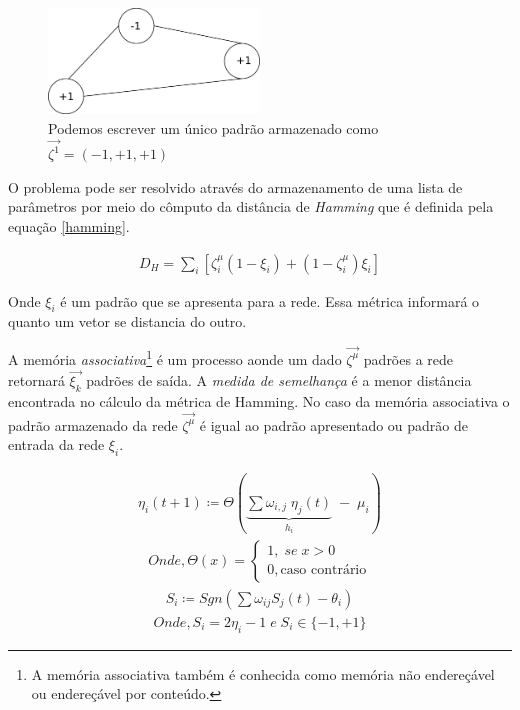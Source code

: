 \begin{figure}[H]
	\centering
	\includegraphics[width=0.5\textwidth]{Imagens/Fig19.png}
	\caption{Podemos escrever um único padrão armazenado como $\vec{\zeta^{1}}=(-1,+1,+1)$}
	\label{1padrao}
\end{figure}

O problema pode ser resolvido através do armazenamento de uma lista de parâmetros por meio do cômputo da distância de \textit{Hamming} que é definida pela equação \ref{hamming}.

\begin{eqnarray}
D_{H} = \sum_{i} [ \zeta^{\mu}_{i} (1-\xi_{i}) + (1 - \zeta^{\mu}_{i}) \xi_{i}]
\label{hamming}
\end{eqnarray}

Onde $\xi_{i}$ é um padrão que se apresenta para a rede. Essa métrica informará o quanto um vetor se distancia do outro.

A memória \textit{associativa}\footnote{A memória associativa também é conhecida como memória não endereçável ou endereçável por conteúdo.} é um processo aonde um dado $\vec{\zeta^{\mu}}$ padrões a rede retornará $\vec{\xi_{k}}$ padrões de saída. A \textit{medida de semelhança} é a menor distância encontrada no cálculo da métrica de Hamming. No caso da memória associativa o padrão armazenado da rede $\vec{\zeta^{\mu}}$ é igual ao padrão apresentado ou padrão de entrada da rede $\xi_{i}$.

\begin{tcolorbox}[colback=green!5,colframe=green!40!black,title=Faça a transformação de variáveis de \ref{ni} para \ref{si}.]
	\begin{eqnarray}
		\eta_{i}(t+1) \coloneqq \Theta\left( \underbrace{\sum \omega_{i,j}\; \eta_{j}(t)}_{h_{i}}\;-\;\mu_{i}\right) 
		\label{ni}
	\end{eqnarray}
	\begin{eqnarray}
	Onde, 
		\Theta(x)=
		\begin{cases}
		1,\; se\; x>0 \\ 
		0, \text{caso contrário}
		\end{cases} \nonumber
	\end{eqnarray}
	\begin{eqnarray}
		S_{i} \coloneqq Sgn (\sum \omega_{ij} S_{j}(t) - \theta_{i} )
		\label{si}
	\end{eqnarray}
	\begin{eqnarray}
	    Onde,
		S_{i}= 2\eta_{i}-1\; e\;  S_{i} \in\{-1,+1\} \nonumber
	\end{eqnarray}
	
\end{tcolorbox}


